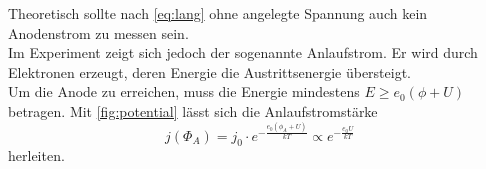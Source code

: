 Theoretisch sollte nach \autoref{eq:lang} ohne angelegte Spannung auch kein Anodenstrom zu messen sein. \\
Im Experiment zeigt sich jedoch der sogenannte Anlaufstrom. 
Er wird durch Elektronen erzeugt, deren Energie die Austrittsenergie übersteigt. \\
Um die Anode zu erreichen, muss die Energie mindestens $E \geq e_0 (\phi + U)$ betragen.
Mit \autoref{fig:potential} lässt sich die Anlaufstromstärke 
\begin{equation}
  j(\Phi_A)= j_0 \cdot e^{- \frac{e_0(\phi_A + U)}{kT}} \propto e^{- \frac{e_0 U}{kT}}
\end{equation} 
herleiten. 




